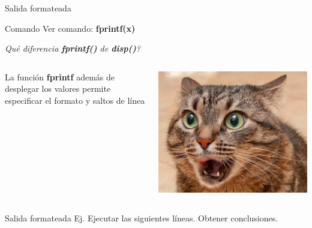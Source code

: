 \documentclass{bredelebeamer}
\begin{document}
\begin{frame}{Salida formateada}
\begin{exampleblock}{Comando}
Ver comando: \textbf{fprintf(x)}
\end{exampleblock}
\begin{center}
\textit{Qué diferencia \textbf{fprintf()} de \textbf{disp()}?}
\end{center}
\begin{columns}
\begin{column}{0.5\textwidth}
\begin{center}
La función \textbf{fprintf} además de desplegar los valores permite especificar el formato y saltos de línea
\end{center}
\end{column}
\begin{column}{0.5\textwidth}
\begin{center}
\includegraphics[scale=0.2]{images/img40.png}
\end{center}
\end{column}
\end{columns}
\end{frame}

\begin{frame}{Salida formateada}
Ej. Ejecutar las siguientes líneas. Obtener conclusiones.

\end{frame}
\end{document}
